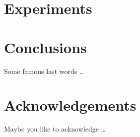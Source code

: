 \documentclass{egpubl}
\begin{document}
\section{Experiments}
\label{sec:Experiments}
\blindtext


\section{Conclusions}
\label{sec:conclusion}
Some famous last words \ldots
\blindtext


\section{Acknowledgements}
\label{sec:acknowledgements}
Maybe you like to acknowledge \ldots 


%


\end{document}
